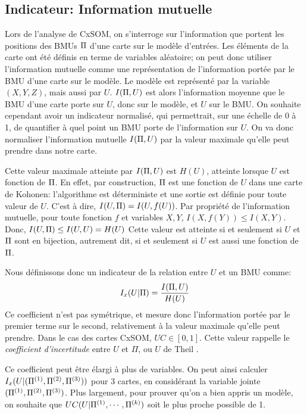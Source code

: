 \subsection{Indicateur: Information mutuelle}

Lors de l'analyse de CxSOM, on s'interroge sur l'information que portent les positions des BMUs $\Pi$ d'une carte sur le modèle d'entrées. Les éléments de la carte ont été définis en terme de variables aléatoire; on peut donc utiliser l'information mutuelle comme une représentation de l'information portée par le BMU d'une carte sur le modèle. Le modèle est représenté par la variable $(X,Y,Z)$, mais aussi par $U$. $I(\Pi, U)$ est alors l'information moyenne que le BMU d'une carte porte sur $U$, donc sur le modèle, et $U$ sur le BMU. On souhaite cependant avoir un indicateur normalisé, qui permettrait, sur une échelle de 0 à 1, de quantifier à quel point un BMU porte de l'information sur $U$. On va donc normaliser l'information mutuelle $I(\Pi,U)$ par la valeur maximale qu'elle peut prendre dans notre carte.


Cette valeur maximale atteinte par $I(\Pi,U)$ est $H(U)$, atteinte lorsque $U$ est fonction de $\Pi$.
En effet, par construction, $\Pi$ est une fonction de $U$ dans une carte de Kohonen: l'algorithme est déterministe et une sortie est définie pour toute valeur de $U$. C'est à dire, $I(U,\Pi) = I (U, f(U))$.
Par propriété de l'information mutuelle, pour toute fonction $f$ et variables $X,Y$, $I(X,f(Y)) \leq I(X,Y) $. 
Donc, $I(U,\Pi) \leq I(U,U) = H(U)$
Cette valeur est atteinte si et seulement si $U$ et $\Pi$ sont en bijection, autrement dit, si et seulement si $U$ est aussi une fonction de $\Pi$.


Nous définissons donc un indicateur de la relation entre $U$ et un BMU comme:
\begin{equation}
I_x(U|\Pi) = \frac{I(\Pi,U)}{H(U)}
\end{equation}
Ce coefficient n'est pas symétrique, et mesure donc l'information portée par le premier terme sur le second, relativement à la valeur maximale qu'elle peut prendre. Dans le cas des cartes CxSOM, $UC \in [0,1]$. Cette valeur rappelle le \emph{coefficient d'incertitude} entre $U$ et $\Pi$, ou $U$ de Theil \cite{Theil1961EconomicFA}.


 
Ce coefficient peut être élargi à plus de variables. On peut ainsi calculer $I_x(U | (\Pi^{({1})},\Pi^{({2})},\Pi^{({3})}))$ pour 3 cartes, en considérant la variable jointe $(\Pi^{({1})},\Pi^{({2})},\Pi^{({3})})$.
Plus largement, pour prouver qu'on a bien appris un modèle, on souhaite que $UC(U|\Pi^{({1})},\cdots,\Pi^{({k})})$ soit le plus proche possible de 1.

